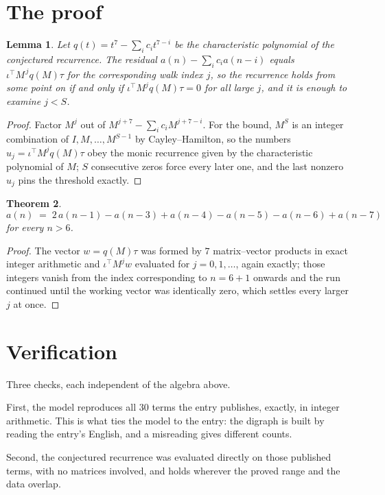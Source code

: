 \documentclass[11pt,a4paper]{article}
\theoremstyle{plain}
\newtheorem{theorem}{Theorem}
\newtheorem{lemma}[theorem]{Lemma}
\theoremstyle{definition}
\begin{document}
\section{The proof}

\begin{lemma}\label{lem:crit}
Let $q(t)=t^{7}-\sum_i c_it^{7-i}$ be the characteristic polynomial of the
conjectured recurrence. The residual $a(n)-\sum_ic_ia(n-i)$ equals
$\iota^{\!\top}M^{\,j}q(M)\tau$ for the corresponding walk index $j$, so the recurrence
holds from some point on if and only if $\iota^{\!\top}M^{j}q(M)\tau=0$ for all large $j$,
and it is enough to examine $j<S$.
\end{lemma}

\begin{proof}
Factor $M^{j}$ out of $M^{j+7}-\sum_ic_iM^{j+7-i}$. For the bound, $M^{S}$
is an integer combination of $I,M,\dots,M^{S-1}$ by Cayley--Hamilton, so the numbers
$u_j=\iota^{\!\top}M^{j}q(M)\tau$ obey the monic recurrence given by the characteristic
polynomial of $M$; $S$ consecutive zeros force every later one, and the last nonzero $u_j$
pins the threshold exactly.
\end{proof}

\begin{theorem}
\[
a(n)\;=\;2\,a(n-1) - a(n-3) + a(n-4) - a(n-5) - a(n-6) + a(n-7)
\]
for every $n>6$.
\end{theorem}

\begin{proof}
The vector $w=q(M)\tau$ was formed by $7$ matrix--vector products in exact integer
arithmetic and $\iota^{\!\top}M^{j}w$ evaluated for $j=0,1,\dots$, again exactly; those
integers vanish from the index corresponding to $n=6+1$ onwards and the run continued
until the working vector was identically zero, which settles every larger $j$ at once.
\end{proof}

\section{Verification}

Three checks, each independent of the algebra above.

First, the model reproduces all $30$ terms the entry publishes, exactly, in integer
arithmetic. This is what ties the model to the entry: the digraph is built by reading the
entry's English, and a misreading gives different counts.

Second, the conjectured recurrence was evaluated directly on those published terms, with no
matrices involved, and holds wherever the proved range and the data overlap.
\end{document}
